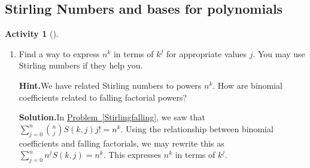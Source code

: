 \documentclass[10pt,]{book}
\theoremstyle{plain}
\theoremstyle{definition}
\newtheorem{activity}[project]{Activity}
\numberwithin{equation}{chapter}
\begin{document}
\subsection[{Stirling Numbers and bases for polynomials}]{Stirling Numbers and bases for polynomials}\label{subsection-35}
\begin{activity}[]\label{powersfromfalling}
~\par
\begin{enumerate}[label=(\alph*)]
 \item Find a way to express \(n^k\) in terms of \(k^{\underline{j}}\) for appropriate values \(j\). You may use Stirling numbers if they help you.%
\par\medskip\noindent%
\textbf{Hint.}\quad We have related Stirling numbers to powers \(n^k\). How are binomial coefficients related to falling factorial powers?%
\par\medskip\noindent%
\textbf{Solution.}\quad In \hyperref[Stirlingfalling]{Problem~\ref{Stirlingfalling}}, we saw that \(\sum_{j=0}^n \binom{n}{j}S(k,j)j! = n^k\). Using the relationship between binomial coefficients and falling factorials, we may rewrite this as \(\sum_{j=0}^n n^{\underline{j}}S(k,j) = n^k\). This expresses \(n^k\) in terms of \(k^{\underline{j}}\).%


\end{enumerate}
\end{activity}
\end{document}
